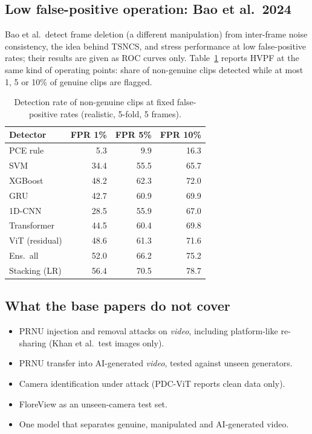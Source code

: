 \documentclass[11pt,a4paper]{article}
\begin{document}
\subsection{Low false-positive operation: Bao et al.~2024}
Bao et al.\ detect frame deletion (a different manipulation) from inter-frame noise consistency, the idea behind TSNCS, and stress performance at low false-positive rates; their results are given as ROC curves only. Table~\ref{tab:lowfpr} reports HVPF at the same kind of operating points: share of non-genuine clips detected while at most 1, 5 or 10\% of genuine clips are flagged.
\begin{table}[H]\centering\small\caption{Detection rate of non-genuine clips at fixed false-positive rates (realistic, 5-fold, 5 frames).}\label{tab:lowfpr}\begin{tabular}{lrrr}\toprule Detector & FPR 1\% & FPR 5\% & FPR 10\% \\\midrule
PCE rule & 5.3 & 9.9 & 16.3 \\
SVM & 34.4 & 55.5 & 65.7 \\
XGBoost & 48.2 & 62.3 & 72.0 \\
GRU & 42.7 & 60.9 & 69.9 \\
1D-CNN & 28.5 & 55.9 & 67.0 \\
Transformer & 44.5 & 60.4 & 69.8 \\
ViT (residual) & 48.6 & 61.3 & 71.6 \\
Ens.\ all & 52.0 & 66.2 & 75.2 \\
Stacking (LR) & 56.4 & 70.5 & 78.7 \\
\bottomrule\end{tabular}\end{table}
\subsection{What the base papers do not cover}\begin{itemize}
\item PRNU injection and removal attacks on \emph{video}, including platform-like re-sharing (Khan et al.\ test images only).
\item PRNU transfer into AI-generated \emph{video}, tested against unseen generators.
\item Camera identification under attack (PDC-ViT reports clean data only).
\item FloreView as an unseen-camera test set.
\item One model that separates genuine, manipulated and AI-generated video.
\end{itemize}
\end{document}
